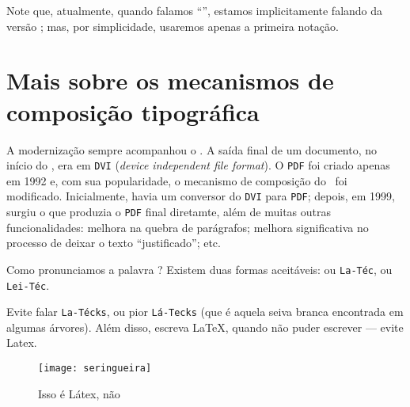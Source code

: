 \begin{center}
  \begin{PostItNote}[Render=tikz, Color=douradoUFRB]
    \sffamily
    Note que, atualmente, quando falamos ``\latex'', estamos implicitamente 
    falando da versão \textrm{}; mas, por simplicidade, usaremos 
    apenas a primeira notação.
  \end{PostItNote}
\end{center}

\section{Mais sobre os mecanismos de composição tipográfica}

A modernização sempre acompanhou o \latex. 
A saída final de um documento, no início do \latex, era em \texttt{DVI} 
(\textit{device independent file format}).  
O \texttt{PDF} foi criado apenas em 1992 e, com sua popularidade, o mecanismo 
de composição do \latex\ foi modificado. 
Inicialmente, havia um conversor do \texttt{DVI} para \texttt{PDF}; depois, em 
1999, surgiu o  que produzia o \texttt{PDF} final diretamte, além 
de muitas outras funcionalidades: melhora na quebra de parágrafos; melhora 
significativa no processo de deixar o texto ``justificado''; etc. 


\begin{center}
  \begin{PostItNote}[Render=tikz, Color=douradoUFRB]
    \sffamily
    Como pronunciamos a palavra \latex ?
    Existem duas formas aceitáveis: ou {\tt La-Téc}, ou {\tt Lei-Téc}. 

    Evite falar {\tt La-Técks}, ou pior {\tt Lá-Tecks} (que é aquela seiva 
    branca encontrada em algumas árvores). 
    Além disso, escreva LaTeX, quando não puder escrever \latex 
    --- evite Latex.
  \end{PostItNote}
\end{center}

\begin{figure}[!htbp]
  \centering
    \texttt{[image: seringueira]}
  \caption{Isso é Látex, não \textrm{}}
\end{figure}
